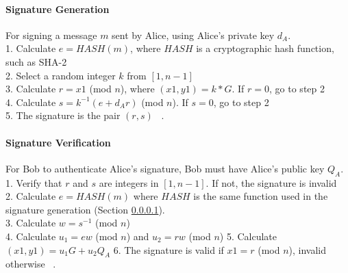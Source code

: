 \documentclass[11pt]{article}
\begin{document}
\paragraph{Signature Generation} \label{Signatue Generation}
For signing a message $m$ sent by Alice, using Alice's private key $d_A$.\\
1. Calculate $e = HASH(m)$, where $HASH$ is a cryptographic hash function, such as SHA-2\\
2. Select a random integer $k$ from $[1,n-1]$\\
3. Calculate $r = x1$ (mod $n$), where $(x1,y1) = k * G$. If $r = 0$, go to step 2\\
4. Calculate $s = k^{-1}(e+d_Ar)$ (mod $n$). If $s = 0$, go to step 2\\
5. The signature is the pair $(r,s)$ ~\cite{hankerson2003guide,anoop2007elliptic,koblitz2000state,silverman2009arithmetic,jurivsic1997elliptic}.

\paragraph{Signature Verification} \label{Signature Verification}
For Bob to authenticate Alice's signature, Bob must have Alice's public key $Q_A$.\\
1. Verify that $r$ and $s$ are integers in $[1,n-1]$. If not, the signature is invalid\\
2. Calculate $e =HASH(m)$ where $HASH$ is the same function used in the signature generation (Section \ref{Signatue Generation}).\\
3. Calculate $w = s^{-1}$ (mod $n$)\\
4. Calculate $u_1 = ew$ (mod $n$) and $u_2 = rw$ (mod $n$)
5. Calculate $(x1,y1) = u_1G + u_2Q_A$
6. The signature is valid if $x1 = r$ (mod $n$), invalid otherwise ~\cite{hankerson2003guide,anoop2007elliptic,koblitz2000state,silverman2009arithmetic,jurivsic1997elliptic}.
\end{document}
